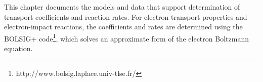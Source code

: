 This chapter documents the models and data that support determination
of transport coefficients and reaction rates.  For electron transport
properties and electron-impact reactions, the coefficients and rates
are determined using the BOLSIG+
code\footnote{http://www.bolsig.laplace.univ-tlse.fr/}, which solves
an approximate form of the electron Boltzmann equation.
